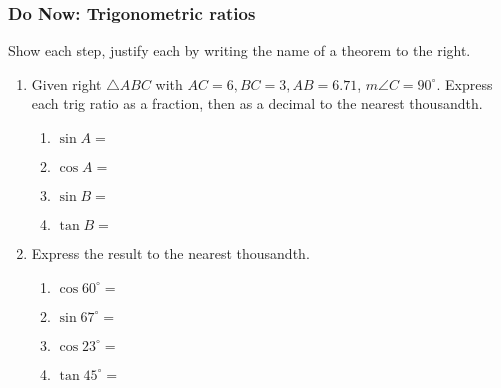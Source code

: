 \documentclass[12pt, oneside]{article}
\begin{document}
\subsubsection*{Do Now: Trigonometric ratios}
Show each step, justify each by writing the name of a theorem to the right.  \begin{enumerate}

  \item Given right $\triangle ABC$ with $AC=6, BC=3, AB=6.71$, $m\angle C=90^\circ$. Express each trig ratio as a fraction, then as a decimal to the nearest thousandth.
    \begin{center}
       \vspace{.1cm}
    \end{center}
    \begin{multicols}{2}
      \begin{enumerate}
        \item $\sin A = $ \vspace{1cm}
        \item $\cos A =$
        \item $\sin B = $ \vspace{1cm}
        \item $\tan B =$
      \end{enumerate}
    \end{multicols}

    \item Express the result to the nearest thousandth.  \vspace{.5cm}
      \begin{multicols}{2}
        \begin{enumerate}
          \item $\cos 60^\circ = $ \vspace{1cm}
          \item $\sin 67^\circ =$
          \item $\cos 23^\circ = $ \vspace{1cm}
          \item $\tan 45^\circ =$
        \end{enumerate}
      \end{multicols} \vspace{1cm}


\end{enumerate}
\end{document}
